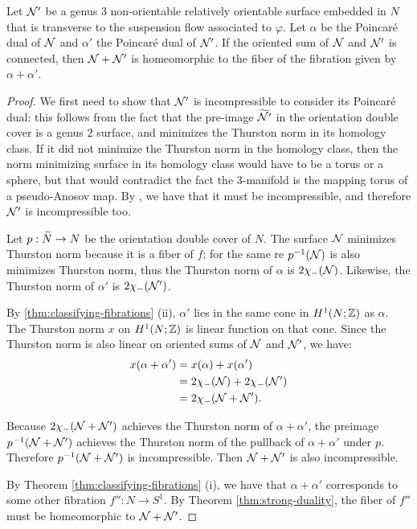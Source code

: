 \begin{prop}
  \label{thm:oriented-sum}
  Let $\mathcal{N}'$ be a genus $3$ non-orientable relatively orientable surface embedded in $N$ that is transverse to the suspension flow associated to $\varphi$.
  Let $\alpha$ be the Poincar\'e dual of $\mathcal{N}$ and $\alpha'$ the Poincar\'e dual of $\mathcal{N}'$.
  If the oriented sum of $\mathcal{N}$ and $\mathcal{N}'$ is connected, then $\mathcal{N} + \mathcal{N}'$ is homeomorphic to the fiber of the fibration given by $\alpha + \alpha'$.
\end{prop}
\begin{proof}
  We first need to show that $\mathcal{N}^{\prime}$ is incompressible to consider its Poincar\'e dual: this follows from the fact that the pre-image $\widetilde{\mathcal{N}^{\prime}}$ in the orientation double cover is a genus $2$ surface, and minimizes the Thurston norm in its homology class.
  If it did not minimize the Thurston norm in the homology class, then the norm minimizing surface in its homology class would have to be a torus or a sphere, but that would contradict the fact the $3$-manifold is the mapping torus of a pseudo-Anosov map. By \cite[Lemma 5.7]{calegari2007foliations}, we have that it must be incompressible, and therefore $\mathcal{N}^{\prime}$ is incompressible too.

  Let $p:\widetilde{N}\rightarrow N$ be the orientation double cover of $N$.
  The surface $\mathcal{N}$ minimizes Thurston norm because it is a fiber of $f$; for the same re $p^{-1}(\mathcal{N})$ is also minimizes Thurston norm, thus the Thurston norm of $\alpha$ is $2\chi_-(\mathcal{N})$.  Likewise, the Thurston norm of $\alpha'$ is $2\chi_-(\mathcal{N}')$.

By \autoref{thm:classifying-fibrations} (ii), $\alpha'$ lies in the same cone in $H^1(N;\mathbb{Z})$ as $\alpha$.  The Thurston norm $x$ on $H^1(N;\mathbb{Z})$ is linear function on that cone.
 Since the Thurston norm is also linear on oriented sums of $\mathcal{N}$ and $\mathcal{N}'$, we have:
  \begin{align*}
    x(\alpha + \alpha') &= x(\alpha) + x(\alpha') \\
                        &= 2\chi_-(\mathcal{N}) + 2\chi_-(\mathcal{N}') \\
                        &= 2\chi_-(\mathcal{N} + \mathcal{N}').
  \end{align*}

  Because $2\chi_-(\mathcal{N}+\mathcal{N}')$ achieves the Thurston norm of $\alpha+\alpha'$, the preimage $p^{-1}(\mathcal{N}+\mathcal{N}')$ achieves the Thurston norm of the pullback of $\alpha+\alpha'$ under $p$.  Therefore $p^{-1}(\mathcal{N}+\mathcal{N}')$ is incompressible.  Then $\mathcal{N}+\mathcal{N}'$ is also incompressible.


  By Theorem \ref{thm:classifying-fibrations} (i), we have that $\alpha + \alpha'$ corresponds to some other fibration $f'':N\rightarrow S^1$.
  By Theorem \ref{thm:strong-duality}, the fiber of $f''$ must be homeomorphic to $\mathcal{N} + \mathcal{N}'$.  
\end{proof}

